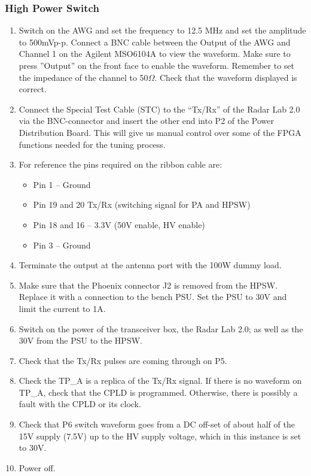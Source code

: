 \subsubsection{High Power Switch}

\begin{enumerate}
	\item Switch on the AWG and set the frequency to 12.5 MHz and set the amplitude to 500mVp-p. Connect a BNC cable between the Output of the AWG and Channel 1 on the Agilent MSO6104A to view the waveform. Make sure to press ”Output” on the front face to enable the waveform. Remember to set the impedance of the channel to 50$\Omega$. Check that the waveform displayed is correct.
	\item Connect the Special Test Cable (STC) to the “Tx/Rx” of the Radar Lab 2.0 via the BNC-connector and insert the other end into P2 of the Power Distribution Board. This will give us manual control over some of the FPGA functions needed for the tuning process.
	\item For reference the pins required on the ribbon cable are:
		\begin{itemize}
			\item Pin 1 – Ground
			\item Pin 19 and 20 Tx/Rx (switching signal for PA and HPSW)
			\item Pin 18 and 16 – 3.3V (50V enable, HV enable)
			\item Pin 3 – Ground
		\end{itemize}
	\item Terminate the output at the antenna port with the 100W dummy load.
	\item Make sure that the Phoenix connector J2 is removed from the HPSW. Replace it with a connection to the bench PSU. Set the PSU to 30V and limit the current to 1A.
	\item Switch on the power of the transceiver box, the Radar Lab 2.0; as well as the 30V from the PSU to the HPSW.
	\item Check that the Tx/Rx pulses are coming through on P5.
	\item Check the TP\_A is a replica of the Tx/Rx signal. If there is no waveform on TP\_A, check that the CPLD is programmed. Otherwise, there is possibly a fault with the CPLD or its clock.
	\item Check that P6 switch waveform goes from a DC off-set of about half of the 15V supply (7.5V) up to the HV supply voltage, which in this instance is set to 30V.
	\item Power off.

\end{enumerate}
